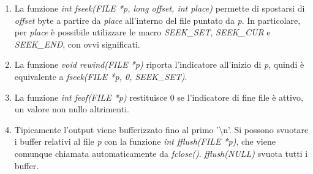 \documentclass[a4paper,11pt]{article}
\begin{document}
\begin{enumerate}[resume]
	\item La funzione \textit{int fseek(FILE *p, long offset, int place)} permette di spostarsi di \textit{offset} byte a partire da \textit{place} all'interno del file puntato da \textit{p}. In particolare, per \textit{place} è possibile utilizzare le macro \textit{SEEK\_SET}, \textit{SEEK\_CUR} e \textit{SEEK\_END}, con ovvi significati.
	\item La funzione \textit{void rewind(FILE *p)} riporta l'indicatore all'inizio di \textit{p}, quindi è equivalente a \textit{fseek(FILE *p, 0, SEEK\_SET)}.
	\item La funzione \textit{int feof(FILE *p)} restituisce 0 se l'indicatore di fine file è attivo, un valore non nullo altrimenti.
	\item Tipicamente l'output viene bufferizzato fino al primo '\textbackslash n'. Si possono svuotare i buffer relativi al file \textit{p} con la funzione \textit{int fflush(FILE *p)}, che viene comunque chiamata automaticamente da \textit{fclose()}. \textit{fflush(NULL)} svuota tutti i buffer. 
\end{enumerate}
\end{document}
